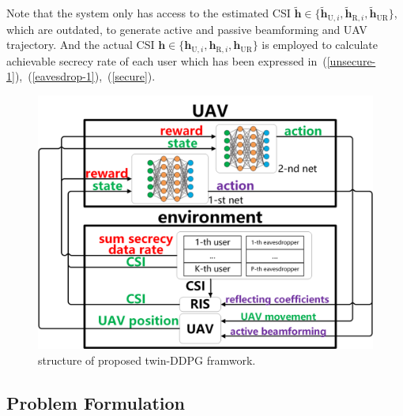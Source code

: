 \documentclass[journal]{IEEEtran}
\begin{document}
Note that the system only has access to the estimated CSI $\tilde{\bm{h}}\in\{ \tilde{\bm{h}}_{\mathrm{U}, i},\tilde{\bm{h}}_{\mathrm{R}, i},\tilde{\bm{h}}_{\mathrm{UR}} \}$, which are outdated, to generate active and passive beamforming and UAV trajectory. And the actual CSI ${\bm{h}}\in\{ {\bm{h}}_{\mathrm{U}, i},{\bm{h}}_{\mathrm{R}, i},{\bm{h}}_{\mathrm{UR}} \}$ is employed to calculate achievable secrecy rate of each user which has been expressed in~(\ref{unsecure-1}),~(\ref{eavesdrop-1}),~(\ref{secure}).
\begin{figure}[t]
	\centering
	\includegraphics[width=1.0\linewidth]{./plot/construction/construction.png}%
	\caption{structure of proposed twin-DDPG framwork.}  \label{structure}
\end{figure}
\subsection{Problem Formulation}
\end{document}
